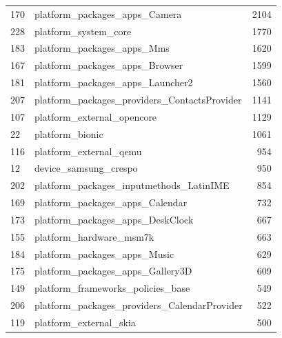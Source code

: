 \documentclass[a4paper,10pt]{article}
\numberwithin{equation}{subsection}
\begin{document}
\begin{table}
\begin{tabularx}{\textwidth}{ | X | l | r |}
170 & platform\_packages\_apps\_Camera & 2104\\ 
228 & platform\_system\_core & 1770\\ 
183 & platform\_packages\_apps\_Mms & 1620\\ 
167 & platform\_packages\_apps\_Browser & 1599\\ 
181 & platform\_packages\_apps\_Launcher2 & 1560\\ 
207 & platform\_packages\_providers\_ContactsProvider & 1141\\ 
107 & platform\_external\_opencore & 1129\\ 
22 & platform\_bionic & 1061\\ 
116 & platform\_external\_qemu & 954\\ 
12 & device\_samsung\_crespo & 950\\ 
202 & platform\_packages\_inputmethods\_LatinIME & 854\\ 
169 & platform\_packages\_apps\_Calendar & 732\\ 
173 & platform\_packages\_apps\_DeskClock & 667\\ 
155 & platform\_hardware\_msm7k & 663\\ 
184 & platform\_packages\_apps\_Music & 629\\ 
175 & platform\_packages\_apps\_Gallery3D & 609\\ 
149 & platform\_frameworks\_policies\_base & 549\\ 
206 & platform\_packages\_providers\_CalendarProvider & 522\\ 
119 & platform\_external\_skia & 500\\
  \hline  
  \end{tabularx}
\end{table}
\end{document}
